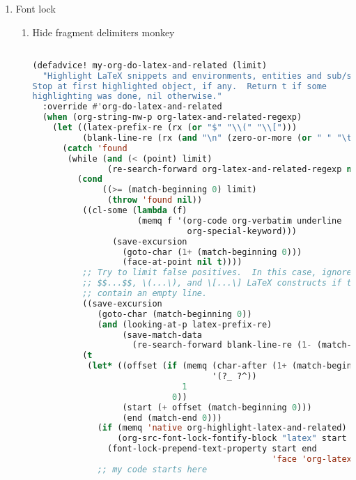 \documentclass[11pt]{article}
\begin{document}
\begin{enumerate}
  \item Font lock
  \label{sec:font-lock}

  
\begin{enumerate}
  \item Hide fragment delimiters\hfill{} monkey
  \label{sec:hide-fragment-delimiters}

  \begin{lstlisting}[language=Lisp]%! Someone please complete this list for me

(defadvice! my-org-do-latex-and-related (limit)
  "Highlight LaTeX snippets and environments, entities and sub/superscript.
Stop at first highlighted object, if any.  Return t if some
highlighting was done, nil otherwise."
  :override #'org-do-latex-and-related
  (when (org-string-nw-p org-latex-and-related-regexp)
    (let ((latex-prefix-re (rx (or "$" "\\(" "\\[")))
          (blank-line-re (rx (and "\n" (zero-or-more (or " " "\t")) "\n"))))
      (catch 'found
       (while (and (< (point) limit)
               (re-search-forward org-latex-and-related-regexp nil t))
         (cond
              ((>= (match-beginning 0) limit)
               (throw 'found nil))
          ((cl-some (lambda (f)
                     (memq f '(org-code org-verbatim underline
                               org-special-keyword)))
                (save-excursion
                  (goto-char (1+ (match-beginning 0)))
                  (face-at-point nil t))))
          ;; Try to limit false positives.  In this case, ignore
          ;; $$...$$, \(...\), and \[...\] LaTeX constructs if they
          ;; contain an empty line.
          ((save-excursion
             (goto-char (match-beginning 0))
             (and (looking-at-p latex-prefix-re)
                  (save-match-data
                    (re-search-forward blank-line-re (1- (match-end 0)) t)))))
          (t
           (let* ((offset (if (memq (char-after (1+ (match-beginning 0)))
                                    '(?_ ?^))
                              1
                            0))
                  (start (+ offset (match-beginning 0)))
                  (end (match-end 0)))
             (if (memq 'native org-highlight-latex-and-related)
                 (org-src-font-lock-fontify-block "latex" start end)
               (font-lock-prepend-text-property start end
                                                'face 'org-latex-and-related))
             ;; my code starts here

\end{lstlisting}
\end{enumerate}
\end{enumerate}
\end{document}
